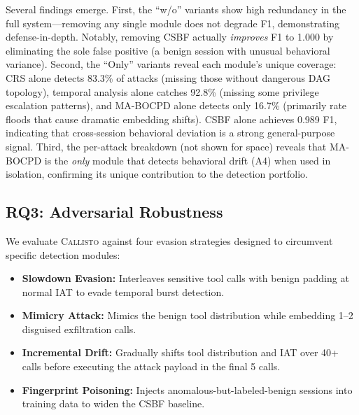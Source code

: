 \documentclass[conference,compsoc]{IEEEtran}
\newcommand{\system}{\textsc{Callisto}}
\begin{document}
Several findings emerge. First, the ``w/o'' variants show high redundancy in the full system---removing any single module does not degrade F1, demonstrating defense-in-depth. Notably, removing CSBF actually \emph{improves} F1 to 1.000 by eliminating the sole false positive (a benign session with unusual behavioral variance). Second, the ``Only'' variants reveal each module's unique coverage: CRS alone detects 83.3\% of attacks (missing those without dangerous DAG topology), temporal analysis alone catches 92.8\% (missing some privilege escalation patterns), and MA-BOCPD alone detects only 16.7\% (primarily rate floods that cause dramatic embedding shifts). CSBF alone achieves 0.989 F1, indicating that cross-session behavioral deviation is a strong general-purpose signal. Third, the per-attack breakdown (not shown for space) reveals that MA-BOCPD is the \emph{only} module that detects behavioral drift (A4) when used in isolation, confirming its unique contribution to the detection portfolio.

\subsection{RQ3: Adversarial Robustness}
\label{sec:adversarial}

We evaluate \system{} against four evasion strategies designed to circumvent specific detection modules:

\begin{itemize}[leftmargin=*,nosep]
\item \textbf{Slowdown Evasion:} Interleaves sensitive tool calls with benign padding at normal IAT to evade temporal burst detection.
\item \textbf{Mimicry Attack:} Mimics the benign tool distribution while embedding 1--2 disguised exfiltration calls.
\item \textbf{Incremental Drift:} Gradually shifts tool distribution and IAT over 40+ calls before executing the attack payload in the final 5 calls.
\item \textbf{Fingerprint Poisoning:} Injects anomalous-but-labeled-benign sessions into training data to widen the CSBF baseline.
\end{itemize}
\end{document}
